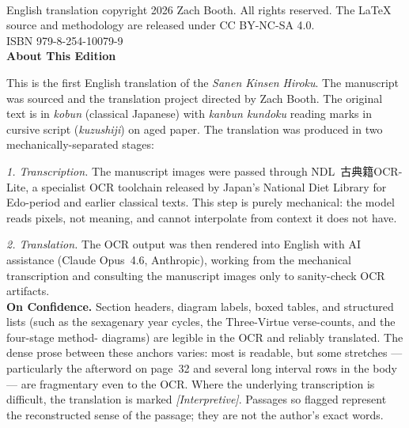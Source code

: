 \documentclass[10pt, openany]{book}
\newcommand{\jp}[1]{{\japanesefont #1}}
\begin{document}
\thispagestyle{empty}
~\vfill

\begin{small}
\noindent English translation copyright \textcopyright{} 2026 Zach Booth.
All rights reserved. The \LaTeX{} source and methodology are released
under CC BY-NC-SA 4.0.\\[0.5em]
ISBN 979-8-254-10079-9\\[1em]

\noindent\textbf{About This Edition}\\[0.3em]
\begin{sloppypar}\noindent This is the first English translation of
the \textit{Sanen Kinsen Hiroku}. The manuscript was sourced and the
translation project directed by Zach Booth. The original text is in
\textit{kobun} (classical Japanese) with \textit{kanbun kundoku}
reading marks in cursive script (\textit{kuzushiji}) on aged paper.
The translation was produced in two mechanically-separated
stages:\end{sloppypar}\par\vspace{0.4em}
\begin{sloppypar}
\noindent\textit{1. Transcription.} The manuscript images were
passed through NDL~\jp{古典籍OCR-Lite}, a specialist OCR toolchain
released by Japan's National Diet Library for Edo-period and earlier
classical texts. This step is purely mechanical: the model reads
pixels, not meaning, and cannot interpolate from context it does
not have.
\end{sloppypar}\vspace{0.3em}
\noindent\textit{2. Translation.} The OCR output was then rendered
into English with AI assistance (Claude Opus~4.6, Anthropic), working
from the mechanical transcription and consulting the manuscript images
only to sanity-check OCR artifacts.\\[0.5em]
\noindent\textbf{On Confidence.} Section headers, diagram labels,
boxed tables, and structured lists (such as the sexagenary year
cycles, the Three-Virtue verse-counts, and the four-stage method-
diagrams) are legible in the OCR and reliably translated. The dense
prose between these anchors varies: most is readable, but some
stretches --- particularly the afterword on page~32 and several
long interval rows in the body --- are fragmentary even to the
OCR. Where the underlying transcription is difficult, the
translation is marked \textit{\mbox{[Interpretive]}}. Passages so
flagged represent the reconstructed sense of the passage; they are
not the author's exact words.\\[1em]


\end{small}
\end{document}
